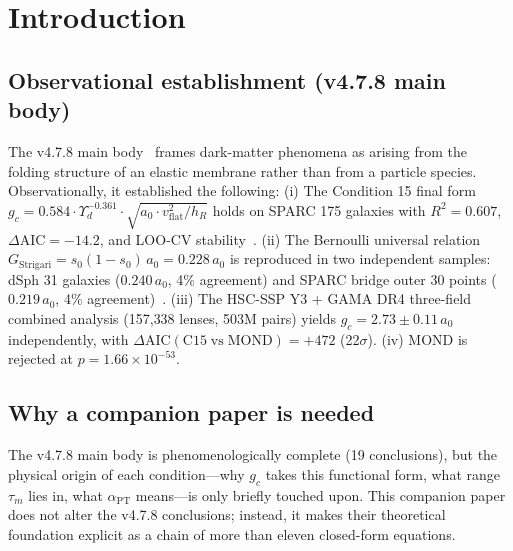 \documentclass[11pt,a4paper]{article}
\newcommand{\Tm}{T_{m}}
\newcommand{\aPT}{\alpha_{\mathrm{PT}}}
\newcommand{\taum}{\tau_{m}}
\newcommand{\taur}{\tau_{\mathrm{relax}}}
\newcommand{\Gammaact}{\Gamma_{\mathrm{actual}}}
\newcommand{\gc}{g_{c}}
\newcommand{\vflat}{v_{\mathrm{flat}}}
\newcommand{\hR}{h_{R}}
\newcommand{\Yd}{\Upsilon_{d}}
\newcommand{\AIC}{\Delta\mathrm{AIC}}
\begin{document}
\begin{abstract}
\smallskip\noindent
\textbf{Limitations:}
(i) The SI absolute calibration of the dimensionless $\Tm = \sqrt{6}$ cannot be determined
internally, leaving a 96-order gap between the $\sigma$ rest-energy candidate and the membrane
coherence candidate.
(ii) Determining the absolute value of the membrane memory rate $\Gammaact$ remains a parallel
evaluation across three routes (normal mode / FDT / observational proxy), reducible to an
energy-branching problem that requires a choice of $\taur$ physics. These limitations are targeted
for the next version (21 cm + CMB TT cross-check).

\smallskip\noindent\textbf{Keywords:} membrane cosmology, dark matter alternative, MOND rejection,
FIRAS $\mu$-distortion, universal density coupling, C15
\end{abstract}

\clearpage

\section{Introduction}

\subsection{Observational establishment (v4.7.8 main body)}
The v4.7.8 main body~\citep{Sakaguchi2026a} frames dark-matter phenomena as arising from the
folding structure of an elastic membrane rather than from a particle species. Observationally, it
established the following:
(i) The Condition 15 final form
$\gc = 0.584 \cdot \Yd^{-0.361} \cdot \sqrt{a_0 \cdot \vflat^2 / \hR}$ holds on SPARC 175 galaxies
with $R^2 = 0.607$, $\AIC = -14.2$, and LOO-CV stability~\citep{Lelli2016}.
(ii) The Bernoulli universal relation $G_{\mathrm{Strigari}} = s_0 (1 - s_0)\,a_0 = 0.228\,a_0$ is
reproduced in two independent samples: dSph 31 galaxies ($0.240\,a_0$, 4\% agreement) and SPARC
bridge outer 30 points ($0.219\,a_0$, 4\% agreement)~\citep{McConnachie2012, Strigari2008}.
(iii) The HSC-SSP Y3 + GAMA DR4 three-field combined analysis (157{,}338 lenses, 503M pairs) yields
$\gc = 2.73 \pm 0.11\,a_0$ independently, with $\AIC(\mathrm{C15\;vs\;MOND}) = +472$ (22$\sigma$).
(iv) MOND is rejected at $p = 1.66 \times 10^{-53}$.

\subsection{Why a companion paper is needed}
The v4.7.8 main body is phenomenologically complete (19 conclusions), but the physical origin of
each condition---why $\gc$ takes this functional form, what range $\taum$ lies in, what $\aPT$
means---is only briefly touched upon. This companion paper does not alter the v4.7.8 conclusions;
instead, it makes their theoretical foundation explicit as a chain of more than eleven closed-form
equations.
\end{document}
